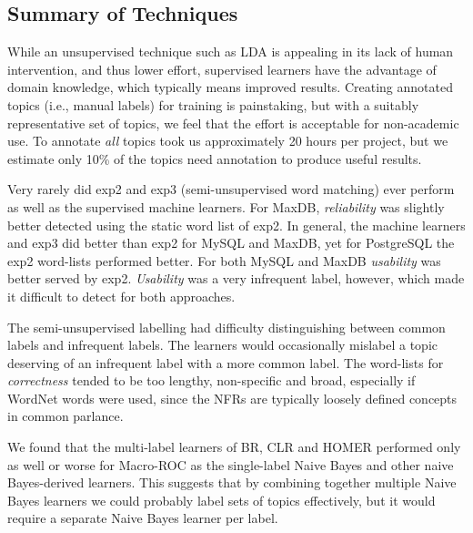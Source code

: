 \documentclass[smallextended]{svjour3}       %
\begin{document}
\subsection{Summary of Techniques}
While an unsupervised technique such as LDA is appealing in its lack of human intervention, and thus lower effort, 
supervised learners have the advantage of domain knowledge, which typically means improved results. 
Creating annotated topics (i.e., manual labels) for training is painstaking, but with a suitably representative set of topics, we feel that the effort is acceptable for non-academic use. To
annotate \emph{all} topics took us approximately 20 hours per project, but we estimate only 10\% of the topics need annotation to produce useful results.

Very rarely did \textsf{exp2} and \textsf{exp3} (semi-unsupervised word matching) ever perform as well as the supervised machine learners. 
For MaxDB, \textit{reliability} was slightly better detected using the static word list of \textsf{exp2}. 
In general, the machine learners and \textsf{exp3} did better than
\textsf{exp2} for MySQL and MaxDB, yet for PostgreSQL the
\textsf{exp2} word-lists performed better.
For both MySQL and MaxDB \textit{usability} was better served by \textsf{exp2}. 
\textit{Usability} was a very infrequent label, however, which made it difficult to detect for both approaches.

The semi-unsupervised labelling had difficulty distinguishing between common labels and infrequent labels. 
The learners would occasionally mislabel a topic deserving of an infrequent label with a more common label.
The word-lists for \emph{correctness} tended to be too lengthy, non-specific and broad, especially if WordNet words were used, since the NFRs are
typically loosely defined concepts in common parlance.

We found that the multi-label learners of BR, CLR and HOMER performed only 
as well or worse for Macro-ROC as the single-label Naive Bayes and other naive Bayes-derived learners. 
This suggests that by combining together multiple Naive Bayes learners
we could probably label sets of topics effectively, but it would
require a separate Naive Bayes learner per label.

\end{document}

